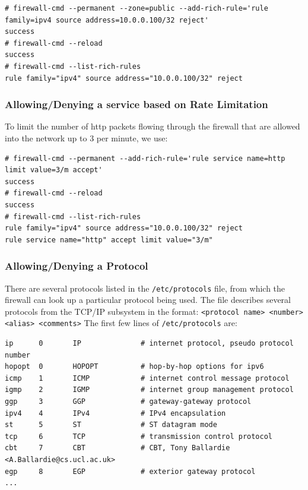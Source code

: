 \vspace{-15pt}
\begin{verbatim}
# firewall-cmd --permanent --zone=public --add-rich-rule='rule family=ipv4 source address=10.0.0.100/32 reject'
success
# firewall-cmd --reload
success
# firewall-cmd --list-rich-rules 
rule family="ipv4" source address="10.0.0.100/32" reject
\end{verbatim}
\vspace{-10pt}	

\subsubsection{Allowing/Denying a service based on Rate Limitation}
\vspace{-10pt}
To limit the number of http packets flowing through the firewall that are allowed into the network up to 3 per minute, we use:

\vspace{-15pt}
\begin{verbatim}
# firewall-cmd --permanent --add-rich-rule='rule service name=http limit value=3/m accept'
success
# firewall-cmd --reload 
success
# firewall-cmd --list-rich-rules 
rule family="ipv4" source address="10.0.0.100/32" reject
rule service name="http" accept limit value="3/m"
\end{verbatim}
\vspace{-10pt}	

\subsubsection{Allowing/Denying a Protocol}
\vspace{-10pt}
There are several protocols listed in the \verb|/etc/protocols|	file, from which the firewall can look up a particular protocol being used. The file describes several protocols from the TCP/IP subsystem in the format: \verb|<protocol name> <number> <alias> <comments>| The first few lines of \verb|/etc/protocols| are: 

\vspace{-15pt}
\begin{verbatim}
ip      0       IP              # internet protocol, pseudo protocol number
hopopt  0       HOPOPT          # hop-by-hop options for ipv6
icmp    1       ICMP            # internet control message protocol
igmp    2       IGMP            # internet group management protocol
ggp     3       GGP             # gateway-gateway protocol
ipv4    4       IPv4            # IPv4 encapsulation
st      5       ST              # ST datagram mode
tcp     6       TCP             # transmission control protocol
cbt     7       CBT             # CBT, Tony Ballardie <A.Ballardie@cs.ucl.ac.uk>
egp     8       EGP             # exterior gateway protocol
...
\end{verbatim}
\vspace{-10pt}	

